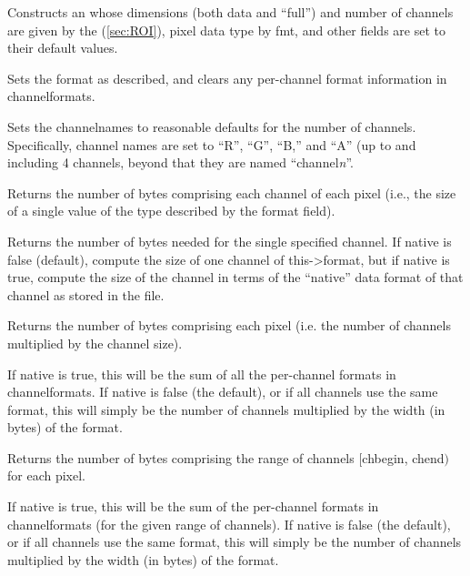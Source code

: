 Constructs an \ImageSpec whose dimensions (both data and ``full'') and
number of channels are given by the \ROI (\ref{sec:ROI}), pixel data type
by {\cf fmt}, and other fields are set to their default values.
\apiend

Sets the format as described, and clears any per-channel format information
in {\cf channelformats}.
\apiend

Sets the {\cf channelnames} to reasonable defaults for the number of
channels.  Specifically, channel names are set to ``R'', ``G'', ``B,''
and ``A'' (up to and including 4 channels, beyond that they are named
``channel\emph{n}''.
\apiend

Returns the number of bytes comprising each channel of each pixel (i.e.,
the size of a single value of the type described by the {\cf format} field).
\apiend

Returns the number of bytes needed for the single specified
channel.  If native is {\cf false} (default), compute the size of one
channel of {\cf this->format}, but if native is {\cf true}, compute the size
of the channel in terms of the ``native'' data format of that
channel as stored in the file.
\apiend

Returns the number of bytes comprising each pixel (i.e. the number of
channels multiplied by the channel size).

If {\cf native} is true, this will be the sum of all the per-channel
formats in {\cf channelformats}.  If {\cf native} is false (the
default), or if all channels use the same format, this will simply be
the number of channels multiplied by the width (in bytes) of the {\cf format}.
\apiend

Returns the number of bytes comprising the range of channels 
  $[${\cf chbegin}, {\cf chend}$)$ for each pixel.

If {\cf native} is true, this will be the sum of the per-channel
formats in {\cf channelformats} (for the given range of channels).  
If {\cf native} is false (the
default), or if all channels use the same format, this will simply be
the number of channels multiplied by the width (in bytes) of the {\cf format}.
\apiend

